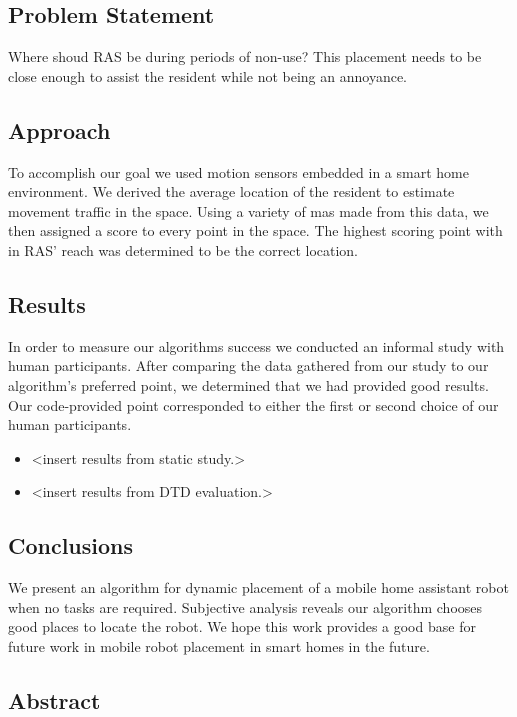 \documentclass[11pt, conference, a4paper]{IEEEtran}
\begin{document}
\subsection{Problem Statement}
Where shoud RAS be during periods of non-use? This placement needs to be close enough to assist the resident while not being an annoyance. 


\subsection{Approach}
To accomplish our goal we used motion sensors embedded in a smart home environment. We derived the average location of the resident to estimate movement traffic in the space. Using a variety of mas made from this data, we then assigned a score to every point in the space. The highest scoring point with in RAS' reach was determined to be the correct location. 


\subsection{Results}
In order to measure our algorithms success we conducted an informal study with human participants. After comparing the data gathered from our study to our algorithm's preferred point, we determined that we had provided good results. Our code-provided point corresponded to either the first or second choice of our human participants.
\begin{itemize}
    \item \textless insert results from static study.\textgreater 
    \item \textless insert results from DTD evaluation.\textgreater
\end{itemize}



\subsection{Conclusions}
We present an algorithm for dynamic placement of a mobile home assistant robot 
when no tasks are required. Subjective analysis reveals our algorithm chooses 
good places to locate the robot. We hope this work provides a good base for 
future work in mobile robot placement in smart homes in the future.


\subsection{Abstract}
\end{document}
